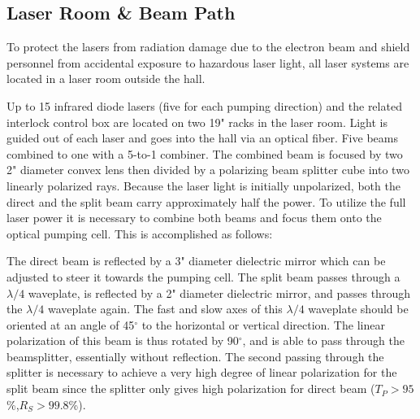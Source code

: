 {%
\subsection{Laser Room \& Beam Path}
\label{sec:las}

To protect the lasers from radiation damage due to the electron beam
and shield personnel from accidental exposure to hazardous laser
light, all laser systems are located in a laser room outside the hall.




Up to 15 infrared diode lasers (five for each pumping direction) and 
the related interlock control box are located on two 19" racks in the laser room.
Light is guided out of each laser and 
goes into the hall via an optical fiber.  
Five beams combined to one with a 5-to-1 combiner. 
The combined beam is focused by two 2" diameter convex lens then 
divided by a polarizing
beam splitter cube into two linearly polarized rays.  Because the
laser light is initially unpolarized, both the direct and the split
beam carry approximately half the power. To utilize the full laser
power it is necessary to combine both beams and focus them onto the
optical pumping cell.  This is accomplished as follows:

The direct beam is reflected by a 3" diameter dielectric mirror which
can be adjusted to steer it towards the pumping cell.  The split beam
passes through a $\lambda/4$ waveplate, is reflected by a 2" diameter
dielectric mirror, and passes through the $\lambda/4$ waveplate again.  The 
fast and slow axes of this $\lambda/4$ waveplate should be oriented at an 
angle of 45$^\circ$ to the horizontal or vertical direction.  The
linear polarization of this beam is thus rotated by 90$^\circ$, and is
able to pass through the beamsplitter, essentially without
reflection.  The second passing through the splitter is necessary to
achieve a very high degree of linear polarization for the split beam
since the splitter only gives high polarization for direct beam 
($T_P>95$\%,$R_S>99.8$\%).

}
